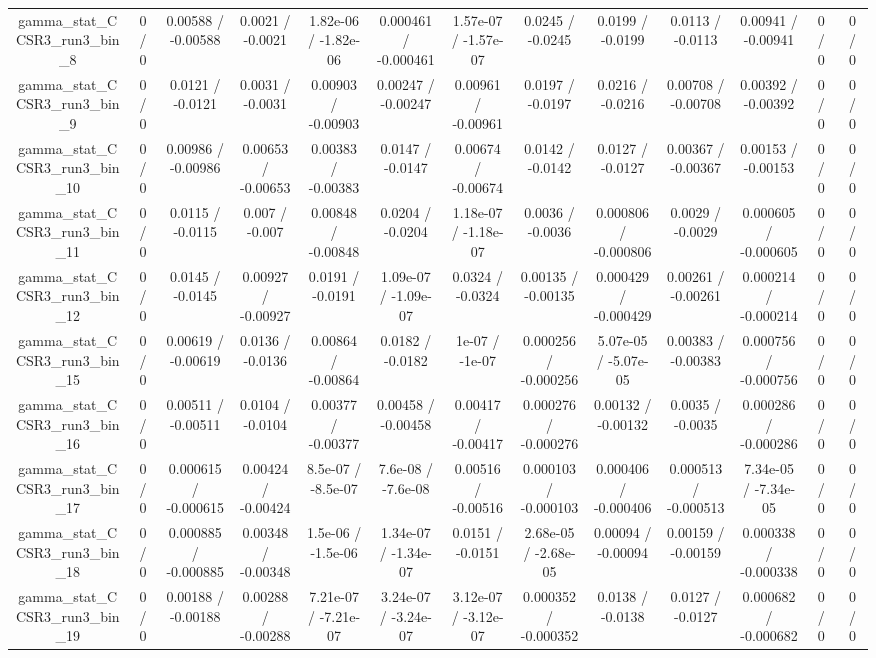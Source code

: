\documentclass[10pt]{article}
\begin{document}
\begin{table}[htbp]
\begin{center}
\begin{tabular}{|c|c|c|c|c|c|c|c|c|c|c|c|c|}
  gamma_stat_CCSR3_run3_bin_8 & 0 / 0 & 0.00588 / -0.00588 & 0.0021 / -0.0021 & 1.82e-06 / -1.82e-06 & 0.000461 / -0.000461 & 1.57e-07 / -1.57e-07 & 0.0245 / -0.0245 & 0.0199 / -0.0199 & 0.0113 / -0.0113 & 0.00941 / -0.00941 & 0 / 0 & 0 / 0 \\ 
  gamma_stat_CCSR3_run3_bin_9 & 0 / 0 & 0.0121 / -0.0121 & 0.0031 / -0.0031 & 0.00903 / -0.00903 & 0.00247 / -0.00247 & 0.00961 / -0.00961 & 0.0197 / -0.0197 & 0.0216 / -0.0216 & 0.00708 / -0.00708 & 0.00392 / -0.00392 & 0 / 0 & 0 / 0 \\ 
  gamma_stat_CCSR3_run3_bin_10 & 0 / 0 & 0.00986 / -0.00986 & 0.00653 / -0.00653 & 0.00383 / -0.00383 & 0.0147 / -0.0147 & 0.00674 / -0.00674 & 0.0142 / -0.0142 & 0.0127 / -0.0127 & 0.00367 / -0.00367 & 0.00153 / -0.00153 & 0 / 0 & 0 / 0 \\ 
  gamma_stat_CCSR3_run3_bin_11 & 0 / 0 & 0.0115 / -0.0115 & 0.007 / -0.007 & 0.00848 / -0.00848 & 0.0204 / -0.0204 & 1.18e-07 / -1.18e-07 & 0.0036 / -0.0036 & 0.000806 / -0.000806 & 0.0029 / -0.0029 & 0.000605 / -0.000605 & 0 / 0 & 0 / 0 \\ 
  gamma_stat_CCSR3_run3_bin_12 & 0 / 0 & 0.0145 / -0.0145 & 0.00927 / -0.00927 & 0.0191 / -0.0191 & 1.09e-07 / -1.09e-07 & 0.0324 / -0.0324 & 0.00135 / -0.00135 & 0.000429 / -0.000429 & 0.00261 / -0.00261 & 0.000214 / -0.000214 & 0 / 0 & 0 / 0 \\ 
  gamma_stat_CCSR3_run3_bin_15 & 0 / 0 & 0.00619 / -0.00619 & 0.0136 / -0.0136 & 0.00864 / -0.00864 & 0.0182 / -0.0182 & 1e-07 / -1e-07 & 0.000256 / -0.000256 & 5.07e-05 / -5.07e-05 & 0.00383 / -0.00383 & 0.000756 / -0.000756 & 0 / 0 & 0 / 0 \\ 
  gamma_stat_CCSR3_run3_bin_16 & 0 / 0 & 0.00511 / -0.00511 & 0.0104 / -0.0104 & 0.00377 / -0.00377 & 0.00458 / -0.00458 & 0.00417 / -0.00417 & 0.000276 / -0.000276 & 0.00132 / -0.00132 & 0.0035 / -0.0035 & 0.000286 / -0.000286 & 0 / 0 & 0 / 0 \\ 
  gamma_stat_CCSR3_run3_bin_17 & 0 / 0 & 0.000615 / -0.000615 & 0.00424 / -0.00424 & 8.5e-07 / -8.5e-07 & 7.6e-08 / -7.6e-08 & 0.00516 / -0.00516 & 0.000103 / -0.000103 & 0.000406 / -0.000406 & 0.000513 / -0.000513 & 7.34e-05 / -7.34e-05 & 0 / 0 & 0 / 0 \\ 
  gamma_stat_CCSR3_run3_bin_18 & 0 / 0 & 0.000885 / -0.000885 & 0.00348 / -0.00348 & 1.5e-06 / -1.5e-06 & 1.34e-07 / -1.34e-07 & 0.0151 / -0.0151 & 2.68e-05 / -2.68e-05 & 0.00094 / -0.00094 & 0.00159 / -0.00159 & 0.000338 / -0.000338 & 0 / 0 & 0 / 0 \\ 
  gamma_stat_CCSR3_run3_bin_19 & 0 / 0 & 0.00188 / -0.00188 & 0.00288 / -0.00288 & 7.21e-07 / -7.21e-07 & 3.24e-07 / -3.24e-07 & 3.12e-07 / -3.12e-07 & 0.000352 / -0.000352 & 0.0138 / -0.0138 & 0.0127 / -0.0127 & 0.000682 / -0.000682 & 0 / 0 & 0 / 0 \\ 

\end{tabular}
\end{center}
\end{table}
\end{document}
